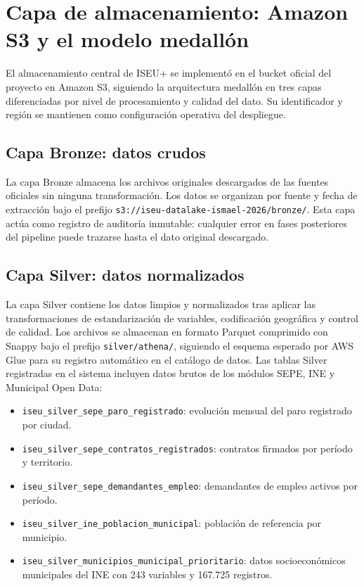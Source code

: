 \section{Capa de almacenamiento: Amazon S3 y el modelo medallón}

El almacenamiento central de ISEU+ se implementó en el bucket oficial del proyecto en Amazon S3, siguiendo la arquitectura medallón en tres capas diferenciadas por nivel de procesamiento y calidad del dato. Su identificador y región se mantienen como configuración operativa del despliegue.

\subsection{Capa Bronze: datos crudos}

La capa Bronze almacena los archivos originales descargados de las fuentes oficiales sin ninguna transformación. Los datos se organizan por fuente y fecha de extracción bajo el prefijo \texttt{s3://iseu-datalake-ismael-2026/bronze/}. Esta capa actúa como registro de auditoría inmutable: cualquier error en fases posteriores del pipeline puede trazarse hasta el dato original descargado.

\subsection{Capa Silver: datos normalizados}

La capa Silver contiene los datos limpios y normalizados tras aplicar las transformaciones de estandarización de variables, codificación geográfica y control de calidad. Los archivos se almacenan en formato Parquet comprimido con Snappy bajo el prefijo \texttt{silver/athena/}, siguiendo el esquema esperado por AWS Glue para su registro automático en el catálogo de datos. Las tablas Silver registradas en el sistema incluyen datos brutos de los módulos SEPE, INE y Municipal Open Data:

\begin{itemize}
  \item \texttt{iseu\_silver\_sepe\_paro\_registrado}: evolución mensual del paro registrado por ciudad.
  \item \texttt{iseu\_silver\_sepe\_contratos\_registrados}: contratos firmados por período y territorio.
  \item \texttt{iseu\_silver\_sepe\_demandantes\_empleo}: demandantes de empleo activos por período.
  \item \texttt{iseu\_silver\_ine\_poblacion\_municipal}: población de referencia por municipio.
  \item \texttt{iseu\_silver\_municipios\_municipal\_prioritario}: datos socioeconómicos municipales del INE con 243 variables y 167.725 registros.
\end{itemize}

